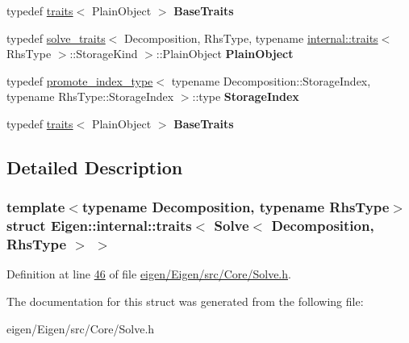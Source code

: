 \begin{DoxyCompactItemize}
typedef \hyperlink{struct_eigen_1_1internal_1_1traits}{traits}$<$ Plain\+Object $>$ {\bfseries Base\+Traits}
\item 
\mbox{\label{struct_eigen_1_1internal_1_1traits_3_01_solve_3_01_decomposition_00_01_rhs_type_01_4_01_4_ac3e6f6f9cceda71019bfe341bdda4bcb}} 
typedef \hyperlink{struct_eigen_1_1internal_1_1solve__traits}{solve\+\_\+traits}$<$ Decomposition, Rhs\+Type, typename \hyperlink{struct_eigen_1_1internal_1_1traits}{internal\+::traits}$<$ Rhs\+Type $>$\+::Storage\+Kind $>$\+::Plain\+Object {\bfseries Plain\+Object}
\item 
\mbox{\label{struct_eigen_1_1internal_1_1traits_3_01_solve_3_01_decomposition_00_01_rhs_type_01_4_01_4_a7b5f686dd63b88493d8b841d51dc4b36}} 
typedef \hyperlink{struct_eigen_1_1internal_1_1promote__index__type}{promote\+\_\+index\+\_\+type}$<$ typename Decomposition\+::\+Storage\+Index, typename Rhs\+Type\+::\+Storage\+Index $>$\+::type {\bfseries Storage\+Index}
\item 
\mbox{\label{struct_eigen_1_1internal_1_1traits_3_01_solve_3_01_decomposition_00_01_rhs_type_01_4_01_4_aaf0ecbe963cd667d5fcba412bbea7f35}} 
typedef \hyperlink{struct_eigen_1_1internal_1_1traits}{traits}$<$ Plain\+Object $>$ {\bfseries Base\+Traits}
\end{DoxyCompactItemize}


\subsection{Detailed Description}
\subsubsection*{template$<$typename Decomposition, typename Rhs\+Type$>$\newline
struct Eigen\+::internal\+::traits$<$ Solve$<$ Decomposition, Rhs\+Type $>$ $>$}



Definition at line \hyperlink{eigen_2_eigen_2src_2_core_2_solve_8h_source_l00046}{46} of file \hyperlink{eigen_2_eigen_2src_2_core_2_solve_8h_source}{eigen/\+Eigen/src/\+Core/\+Solve.\+h}.



The documentation for this struct was generated from the following file\+:\begin{DoxyCompactItemize}
\item 
eigen/\+Eigen/src/\+Core/\+Solve.\+h\end{DoxyCompactItemize}
